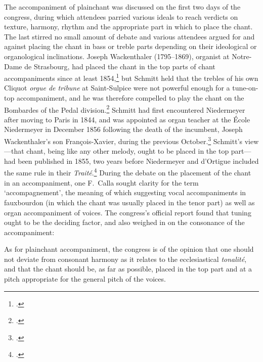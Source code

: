 The accompaniment of plainchant was discussed on the first two days of the congress, during which attendees parried various ideals to reach verdicts on texture, harmony, rhythm and the appropriate part in which to place the chant.
The last stirred no small amount of debate and various attendees argued for and against placing the chant in bass or treble parts depending on their ideological or organological inclinations.
Joseph Wackenthaler (1795--1869), organist at Notre-Dame de Strasbourg, had placed the chant in the top parts of chant accompaniments since at least 1854,\footcite[2]{Wackenthalerartaccompagnerplainchant1854} but Schmitt held that the trebles of his own Cliquot \emph{orgue de tribune} at Saint-Sulpice were not powerful enough for a tune-on-top accompaniment, and he was therefore compelled to play the chant on the Bombardes of the Pedal division.\footcite[533]{GrandjeanOrgelundOper2015}
Schmitt had first encountered Niedermeyer after moving to Paris in 1844, and was appointed as organ teacher at the École Niedermeyer in December 1856 following the death of the incumbent, Joseph Wackenthaler's son François-Xavier, during the previous October.\footcite[210]{OchseOrganistsOrganPlaying2000}
Schmitt's view---that chant, being like any other melody, ought to be placed in the top part---had been published in 1855, two years before Niedermeyer and d'Ortigue included the same rule in their \emph{Traité}.\footcite[55--6]{SchmittNouveaumanuelcomplet1855}
During the debate on the placement of the chant in an accompaniment, one F.\ Calla sought clarity for the term `accompagnement', the meaning of which suggesting vocal accompaniments in fauxbourdon (in which the chant was usually placed in the tenor part) as well as organ accompaniment of voices.
The congress's official report found that tuning ought to be the deciding factor, and also weighed in on the consonance of the accompaniment:
\pagebreak{}

  {\cite[227, 238, 242]{Vroyemusiquereligieusecongres1866}}
{As for plainchant accompaniment, the congress is of the opinion that one should not deviate from consonant harmony as it relates to the ecclesiastical \emph{tonalité}, and that the chant should be, as far as possible, placed in the top part and at a pitch appropriate for the general pitch of the voices.}

